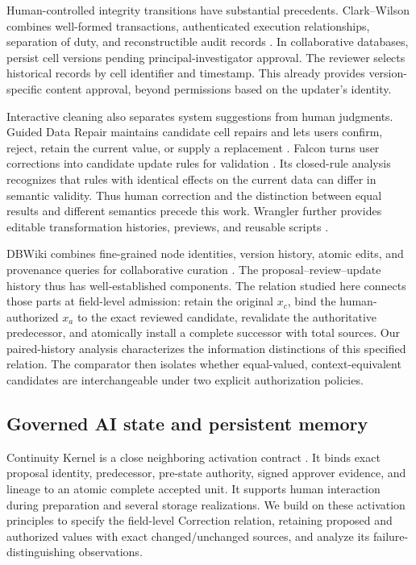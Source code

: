 Human-controlled integrity transitions have substantial precedents. Clark--Wilson combines well-formed transactions, authenticated execution relationships, separation of duty, and reconstructible audit records \citep{clark1987integrity}. In collaborative databases, \citet{mershad2015approval} persist cell versions pending principal-investigator approval. The reviewer selects historical records by cell identifier and timestamp. This already provides version-specific content approval, beyond permissions based on the updater's identity.

Interactive cleaning also separates system suggestions from human judgments. Guided Data Repair maintains candidate cell repairs and lets users confirm, reject, retain the current value, or supply a replacement \citep{yakout2011guided}. Falcon turns user corrections into candidate update rules for validation \citep{he2016falcon}. Its closed-rule analysis recognizes that rules with identical effects on the current data can differ in semantic validity. Thus human correction and the distinction between equal results and different semantics precede this work. Wrangler further provides editable transformation histories, previews, and reusable scripts \citep{kandel2011wrangler}.

DBWiki combines fine-grained node identities, version history, atomic edits, and provenance queries for collaborative curation \citep{buneman2011dbwiki}. The proposal--review--update history thus has well-established components. The relation studied here connects those parts at field-level admission: retain the original $x_c$, bind the human-authorized $x_a$ to the exact reviewed candidate, revalidate the authoritative predecessor, and atomically install a complete successor with total sources. Our paired-history analysis characterizes the information distinctions of this specified relation. The comparator then isolates whether equal-valued, context-equivalent candidates are interchangeable under two explicit authorization policies.

\subsection{Governed AI state and persistent memory}

Continuity Kernel is a close neighboring activation contract \citep{he2026continuity}. It binds exact proposal identity, predecessor, pre-state authority, signed approver evidence, and lineage to an atomic complete accepted unit. It supports human interaction during preparation and several storage realizations. We build on these activation principles to specify the field-level Correction relation, retaining proposed and authorized values with exact changed/unchanged sources, and analyze its failure-distinguishing observations.

